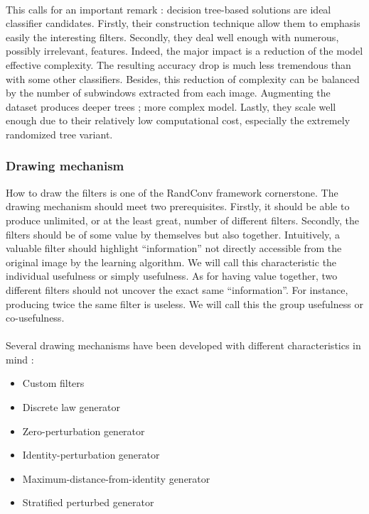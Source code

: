 \documentclass[a4paper]{report}
\begin{document}
		\paragraph{}
		This calls for an important remark : decision tree-based solutions are ideal classifier candidates. Firstly, their construction technique allow them to emphasis easily the interesting filters. Secondly, they deal well enough with numerous, possibly irrelevant, features. Indeed, the major impact is a reduction of the model effective complexity. The resulting accuracy drop is much less tremendous than with some other classifiers. Besides, this reduction of complexity can be balanced by the number of subwindows extracted from each image. Augmenting the dataset produces deeper trees ; more complex model. Lastly, they scale well enough due to their relatively low computational cost, especially the extremely randomized tree variant.
		
			
			
			\subsubsection{Drawing mechanism}
			How to draw the filters is one of the RandConv framework cornerstone. The drawing mechanism should meet two prerequisites. Firstly, it should be able to produce unlimited, or at the least great, number of different filters. Secondly, the filters should be of some value by themselves but also together. Intuitively, a valuable filter should highlight ``information'' not directly accessible from the original image by the learning algorithm. We will call this characteristic the individual usefulness or simply usefulness. As for having value together, two different filters should not uncover the exact same ``information''. For instance, producing twice the same filter is useless. We will call this the group usefulness or co-usefulness.
			
			\paragraph{}
			Several drawing mechanisms have been developed with different characteristics in mind :
			
			\begin{itemize}
				\item Custom filters
				\item Discrete law generator
				\item Zero-perturbation generator
				\item Identity-perturbation generator
				\item Maximum-distance-from-identity generator
				\item Stratified perturbed generator
			\end{itemize}
			
\end{document}
